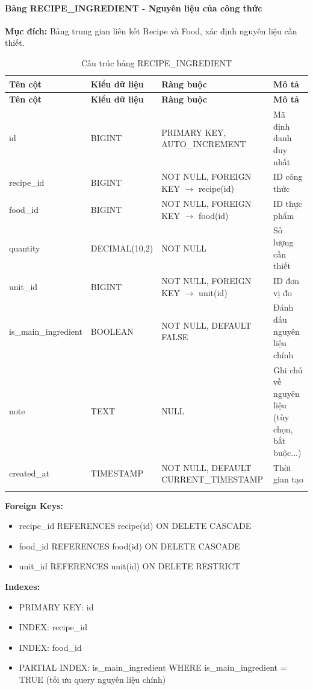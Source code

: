 \paragraph{Bảng RECIPE\_INGREDIENT - Nguyên liệu của công thức}
\textbf{Mục đích:} Bảng trung gian liên kết Recipe và Food, xác định nguyên liệu cần thiết.

\small
\begin{longtable}{|>{\raggedright\arraybackslash}p{3.5cm}|>{\raggedright\arraybackslash}p{3cm}|>{\raggedright\arraybackslash}p{4cm}|>{\raggedright\arraybackslash}p{4cm}|}
\hline
\textbf{Tên cột} & \textbf{Kiểu dữ liệu} & \textbf{Ràng buộc} & \textbf{Mô tả} \\
\hline
\endfirsthead
\hline
\textbf{Tên cột} & \textbf{Kiểu dữ liệu} & \textbf{Ràng buộc} & \textbf{Mô tả} \\
\hline
\endhead
id & BIGINT & PRIMARY KEY, AUTO\_INCREMENT & Mã định danh duy nhất \\
\hline
recipe\_id & BIGINT & NOT NULL, FOREIGN KEY $\rightarrow$ recipe(id) & ID công thức \\
\hline
food\_id & BIGINT & NOT NULL, FOREIGN KEY $\rightarrow$ food(id) & ID thực phẩm \\
\hline
quantity & DECIMAL(10,2) & NOT NULL & Số lượng cần thiết \\
\hline
unit\_id & BIGINT & NOT NULL, FOREIGN KEY $\rightarrow$ unit(id) & ID đơn vị đo \\
\hline
is\_main\_ingredient & BOOLEAN & NOT NULL, DEFAULT FALSE & Đánh dấu nguyên liệu chính \\
\hline
note & TEXT & NULL & Ghi chú về nguyên liệu (tùy chọn, bắt buộc...) \\
\hline
created\_at & TIMESTAMP & NOT NULL, DEFAULT CURRENT\_TIMESTAMP & Thời gian tạo \\
\hline
\caption{Cấu trúc bảng RECIPE\_INGREDIENT}
\end{longtable}

\textbf{Foreign Keys:}
\begin{itemize}
    \item recipe\_id REFERENCES recipe(id) ON DELETE CASCADE
    \item food\_id REFERENCES food(id) ON DELETE CASCADE
    \item unit\_id REFERENCES unit(id) ON DELETE RESTRICT
\end{itemize}

\textbf{Indexes:}
\begin{itemize}
    \item PRIMARY KEY: id
    \item INDEX: recipe\_id
    \item INDEX: food\_id
    \item PARTIAL INDEX: is\_main\_ingredient WHERE is\_main\_ingredient = TRUE (tối ưu query nguyên liệu chính)
\end{itemize}

